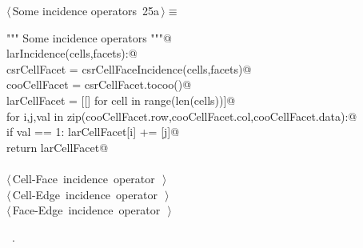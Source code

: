 \documentclass[11pt,oneside]{article}	%
\begin{document}
\begin{flushleft} \small \label{scrap39}
\protect{}$\langle\,$Some incidence operators\nobreak\ {\footnotesize 25a}$\,\rangle\equiv$
\vspace{-1ex}
\begin{list}{}{} \item
\mbox{}\verb@""" Some incidence operators """@\\
\mbox{}\verb@def larIncidence(cells,facets):@\\
\mbox{}\verb@   csrCellFacet = csrCellFaceIncidence(cells,facets)@\\
\mbox{}\verb@   cooCellFacet = csrCellFacet.tocoo()@\\
\mbox{}\verb@   larCellFacet = [[] for cell in range(len(cells))]@\\
\mbox{}\verb@   for i,j,val in zip(cooCellFacet.row,cooCellFacet.col,cooCellFacet.data):@\\
\mbox{}\verb@      if val == 1: larCellFacet[i] += [j]@\\
\mbox{}\verb@   return larCellFacet@\\
\mbox{}\verb@@\\
\mbox{}\verb@@\hbox{$\langle\,$Cell-Face incidence operator\nobreak\ {\footnotesize {}}$\,\rangle$}\verb@@\\
\mbox{}\verb@@\hbox{$\langle\,$Cell-Edge incidence operator\nobreak\ {\footnotesize {}}$\,\rangle$}\verb@@\\
\mbox{}\verb@@\hbox{$\langle\,$Face-Edge incidence operator\nobreak\ {\footnotesize {}}$\,\rangle$}\verb@@\\
\mbox{}\verb@@{\NWsep}
\end{list}
\vspace{-1ex}
\footnotesize\addtolength{\baselineskip}{-1ex}
\begin{list}{}{\setlength{\itemsep}{-\parsep}\setlength{\itemindent}{-\leftmargin}}
\item \NWtxtMacroRefIn\ .
\end{list}
\end{flushleft}
\end{document}
